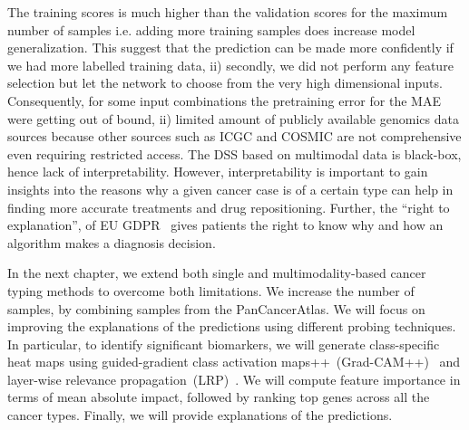 \hspace*{3.5mm} The training scores is much higher than the validation scores for the maximum number of samples i.e. adding more training samples does increase model generalization. This suggest that the prediction can be made more confidently if we had more labelled training data, ii) secondly, we did not perform any feature selection but let the network to choose from the very high dimensional inputs. Consequently, for some input combinations the pretraining error for the MAE were getting out of bound, ii) limited amount of publicly available genomics data sources because other sources such as ICGC and COSMIC are not comprehensive even requiring restricted access. The DSS based on multimodal data is black-box, hence lack of interpretability. However, interpretability is important to gain insights into the reasons why a given cancer case is of a certain type can help in finding more accurate treatments and drug repositioning. Further, the ``right to explanation'', of EU GDPR~\cite{kaminski2019right} gives patients the right to know why and how an algorithm makes a diagnosis decision. 

\hspace*{3.5mm} In the next chapter, we extend both single and multimodality-based cancer typing methods to overcome both limitations. We increase the number of samples, by combining samples from the PanCancerAtlas. We will focus on improving the explanations of the predictions using different probing techniques.
In particular, to identify significant biomarkers, we will generate class-specific heat maps using guided-gradient class activation maps++~(Grad-CAM++)~\cite{chattopadhay2018grad} and layer-wise relevance propagation~(LRP)~\cite{LRP3}. We will compute feature importance in terms of mean absolute impact, followed by ranking top genes across all the cancer types. Finally, we will provide explanations of the predictions.  
